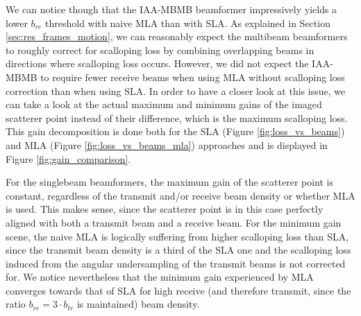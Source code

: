 We can notice though that the IAA-MBMB beamformer impressively yields a lower $b_{re}$ threshold with naive MLA than with SLA.
As explained in Section \ref{sec:res_frames_motion}, we can reasonably expect the multibeam beamformers to roughly correct for scalloping loss by combining overlapping beams in directions where scalloping loss occurs.
However, we did not expect the IAA-MBMB to require fewer receive beams when using MLA without scalloping loss correction than when using SLA.
In order to have a closer look at this issue, we can take a look at the actual maximum and minimum gains of the imaged scatterer point instead of their difference, which is the maximum scalloping loss.
This gain decomposition is done both for the SLA (Figure \ref{fig:loss_vs_beams}) and MLA (Figure \ref{fig:loss_vs_beams_mla}) approaches and is displayed in Figure \ref{fig:gain_comparison}.

For the singlebeam beamformers, the maximum gain of the scatterer point is constant, regardless of the transmit and/or receive beam density or whether MLA is used.
This makes sense, since the scatterer point is in this case perfectly aligned with both a transmit beam and a receive beam.
For the minimum gain scene, the naive MLA is logically suffering from higher scalloping loss than SLA, since the transmit beam density is a third of the SLA one and the scalloping loss induced from the angular undersampling of the transmit beams is not corrected for.
We notice nevertheless that the minimum gain experienced by MLA converges towards that of SLA for high receive (and therefore transmit, since the ratio $b_{re} = 3 \cdot b_{tr}$ is maintained) beam density.

